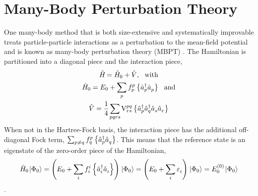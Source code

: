 \documentclass[thesis.tex]{subfiles}
\begin{document}
\section{Many-Body Perturbation Theory}
One many-body method that is both size-extensive and systematically improvable treats particle-particle interactions as a perturbation to the mean-field potential and is known as many-body perturbation theory (MBPT) \cite{MOLLER1934,HUBBARD1957539,HUGENHOLTZ1957481,SHAVITT2009}.  The Hamiltonian is partitioned into a diagonal piece and the interaction piece,
\begin{gather} \label{eq:mbpt_hamiltonian}
  \Ham = \Ham_{0} + \hat{V},\ \ \text{with} \notag \\
  \Ham_{0} = E_{0} + \sum_{\mathclap{p}}\fint{p}{p}\normord{\co{p}\ao{p}}\ \ \text{and} \notag \\
  \hat{V} = \frac{1}{4}\sum_{\mathclap{pqrs}}\vint{pq}{rs}\normord{\co{p}\co{q}\ao{s}\ao{r}}
\end{gather}
When not in the Hartree-Fock basis, the interaction piece has the additional off-diagonal Fock term, $\sum_{p\neq q}f^{p}_{q}\left\{\hat{a}_{p}^{\dagger}\hat{a}_{q}^{}\right\}$.  This means that the reference state is an eigenstate of the zero-order piece of the Hamiltonian,
\begin{equation}
  \Ham_{0}\refket = \left(E_{0} + \sum_{\mathclap{i}}\fint{i}{i}\normord{\co{i}\ao{i}}\right)\refket = \left(E_{0} + \sum_{\mathclap{i}}\Edenom{}{i}\right)\refket = E^{(0)}_{0}\refket
\end{equation}.
\end{document}
